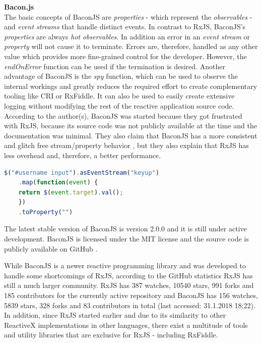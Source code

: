	\textbf{Bacon.js}\\
	The basic concepts of BaconJS \cite{BaconJS} are \emph{properties} - which represent the \emph{observables} - and \emph{event streams} that handle distinct events. 
	In contrast to RxJS, BaconJS's \emph{properties} are always \emph{hot} \emph{observables}. In addition an error in an \emph{event stream} or \emph{property} will not cause it to terminate. Errors are, therefore, handled as any other value which provides more fine-grained control for the developer. However, the \emph{endOnError} function can be used if the termination is desired. 
	Another advantage of BaconJS is the \emph{spy} function, which can be used to observe the internal workings and greatly reduces the required effort to create complementary tooling like CRI or RxFiddle. It can also be used to easily create extensive logging without modifying the rest of the reactive application source code. According to the author(s), BaconJS was started because they got frustrated with RxJS, because its source code was not publicly available at the time and the documentation was minimal. They also claim that BaconJS has a more consistent and glitch free stream/property behavior \cite{BaconJSRepo}, but they also explain that RxJS has less overhead and, therefore, a better performance. 
		\begin{lstlisting}[language=JavaScript, caption={Example of BaconJS code.},label={lst:Bacon}]
	$("#username input").asEventStream("keyup")
	.map(function(event) {
	return $(event.target).val();
	})
	.toProperty("")
	\end{lstlisting}
	The latest stable version of BaconJS is version 2.0.0 and it is still under active development. BaconJS is licensed under the MIT license and the source code is publicly available on GitHub \cite{BaconJSRepo}.

	While BaconJS is a newer reactive programming library and was developed to handle some shortcomings of RxJS, according to the GitHub statistics RxJS has still a much larger community. RxJS has 387 watches, 10540 stars, 991 forks and 185 contributors for the currently active repository and BaconJS has 156 watches, 5839 stars, 328 forks and 83 contributors in total (last accessed: 31.1.2018 18:22).
	In addition, since RxJS started earlier and due to its similarity to other ReactiveX implementations in other languages, there exist a multitude of tools and utility libraries that are exclusive for RxJS - including RxFiddle.

